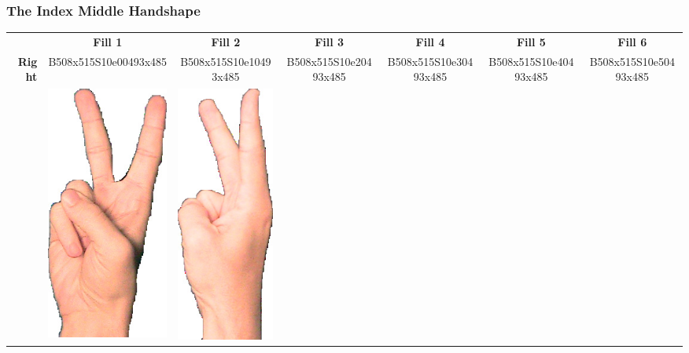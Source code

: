 \documentclass{article}
\begin{document}
\subsubsection{The Index Middle Handshape}

\begin{center}
\begin{tabular}{r*{6}{c}}
&\textbf{Fill 1}&\textbf{Fill 2}&\textbf{Fill 3}&\textbf{Fill 4}&\textbf{Fill 5}&\textbf{Fill 6}\\
\multirow{2}{*}{\textbf{Right}}&
B508x515S10e00493x485&
B508x515S10e10493x485&
B508x515S10e20493x485&
B508x515S10e30493x485&
B508x515S10e40493x485&
B508x515S10e50493x485\\
&
\includegraphics[scale=0.1]{images/02-01-1.jpg}&
\includegraphics[scale=0.1]{images/02-01-2.jpg}&

\end{tabular}
\end{center}
\end{document}
